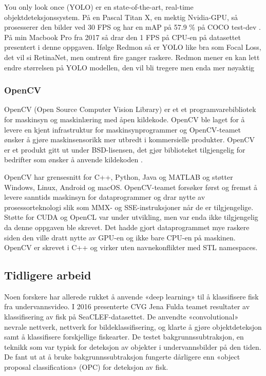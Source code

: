 You only look once (YOLO) er en state-of-the-art, real-time objektdeteksjonssystem. På en Pascal Titan X, en mektig Nvidia-GPU, så prosesserer den bilder ved 30 FPS og har en mAP på 57.9 \% på COCO test-dev \cite{Redmon 2018}. På min Macbook Pro fra 2017 så drar den 1 FPS på CPU-en på datasettet presentert i denne oppgaven. Ifølge Redmon så er YOLO like bra som Focal Loss, det vil si RetinaNet, men omtrent fire ganger raskere. Redmon mener en kan lett endre størrelsen på YOLO modellen, den vil bli tregere men enda mer nøyaktig \cite{Redmon 2016}%

\subsubsection{OpenCV}

OpenCV (Open Source Computer Vision Library) er et et programvarebibliotek for maskinsyn og maskinlæring med åpen kildekode. OpenCV ble laget for å levere en kjent infrastruktur for maskinsynprogrammer og OpenCV-teamet ønsker å gjøre maskinsensorikk mer utbredt i kommersielle produkter. OpenCV er et produkt gitt ut under BSD-lisensen, det gjør biblioteket tilgjengelig for bedrifter som ønsker å anvende kildekoden \cite{OpenCV Team 2020}.

OpenCV har grensesnitt for C++, Python, Java og MATLAB og støtter Windows, Linux, Android og macOS. OpenCV-teamet forsøker først og fremst å levere sanntids maskinsyn for dataprogrammer og drar nytte av prosessorteknologi slik som MMX- og SSE-instruksjoner når de er tilgjengelige. Støtte for CUDA og OpenCL var under utvikling, men var enda ikke tilgjengelig da denne oppgaven ble skrevet. Det hadde gjort dataprogrammet mye raskere siden den ville dratt nytte av GPU-en og ikke bare CPU-en på maskinen. OpenCV er skrevet i C++ og virker uten navnekonflikter med STL namespaces. \cite{OpenCV Team 2020}

\subsection{Tidligere arbeid}

\label{part:prev_work}
Noen forskere har allerede rukket å anvende «deep learning» til å klassifisere fisk fra undervannsvideo. I 2016 presenterte CVG Jena Fulda teamet resultater av klassifisering av fisk på SeaCLEF-datasettet. De anvendte «convolutional» nevrale nettverk, nettverk for bildeklassifisering, og klarte å gjøre objektdeteksjon samt å klassifisere forskjellige fiskearter. De testet bakgrunnssubtraksjon, en teknikk som var typisk for deteksjon av objekter i undervannsbilder på den tiden. De fant ut at å bruke bakgrunnssubtraksjon fungerte dårligere enn «object proposal classification» (OPC) for deteksjon av fisk. \cite{Rodner m.fl. 2016}

